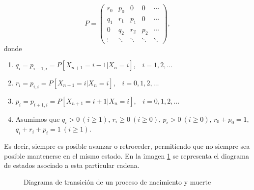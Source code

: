 \begin{equation}
    \label{eq:matriz-pnm}
    P = \begin{pmatrix}
        r_0 & p_0 & 0 & 0 & \cdots \\
        q_1 & r_1 & p_1 & 0 & \cdots \\
        0 & q_2 & r_2 & p_2 & \cdots \\
        \vdots & \ddots & \ddots & \ddots & \ddots 
    \end{pmatrix},
\end{equation}
donde
\begin{enumerate}
    \item $q_i = p_{i-1,i} = P[X_{n+1}=i-1|X_n=i]$, $\ \ \ i=1,2,\dots$
    \item $r_i = p_{i,i} = P[X_{n+1}=i|X_n=i]$, $\ \ \ i=0,1,2,\dots$
    \item $p_i = p_{i+1,i} = P[X_{n+1}=i+1|X_n=i]$, $\ \ \ i=0,1,2,\dots$
    \item Asumimos que $q_i > 0 \ (i\geq 1)$, $r_i\geq 0 \  (i\geq 0)$, $p_i>0 \ (i\geq 0)$, $r_0+p_0 =1$, $q_i+r_i+p_i=1 \ (i\geq 1)$.
\end{enumerate}

Es decir, siempre es posible avanzar o retroceder, permitiendo que no siempre sea posible mantenerse en el mismo estado. En la imagen \ref{img:diagrama-trans-pnm} se representa el diagrama de estados asociado a esta particular cadena.

\begin{figure}[ht] 
    \label{img:diagrama-trans-pnm}
    \centering 
    \caption{Diagrama de transición de un proceso de nacimiento y muerte}
    \end{figure}

